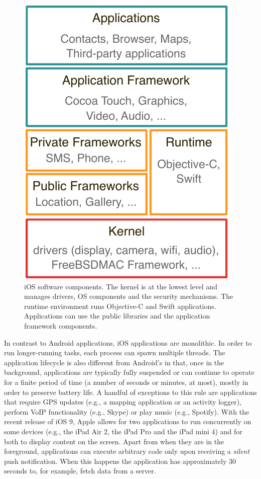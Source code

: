 \begin{figure}[!t]
    \centering
    \includegraphics[width=.5\columnwidth]{figures/others/bg_ios}
    \caption[iOS software components]{iOS software components. The kernel is at the lowest level and manages drivers, OS components and the security mechanisms. The runtime environment runs Objective-C and Swift applications. Applications can use the public libraries and the application framework components.}
    \label{fig:bg_ios_stack}
\end{figure}

In contrast to Android applications, iOS applications are monolithic. In order to run longer-running tasks, each process can spawn multiple threads. The application lifecycle is also different from Android's in that, once in the background, applications are typically fully suspended or can continue to operate for a finite period of time (a number of seconds or minutes, at most), mostly in order to preserve battery life. A handful of exceptions to this rule are applications that require GPS updates (e.g., a mapping application or an activity logger), perform VoIP functionality (e.g., Skype) or play music (e.g., Spotify). With the recent release of iOS 9, Apple allows for two applications to run concurrently on some devices (e.g., the iPad Air 2, the iPad Pro and the iPad mini 4) and for both to display content on the screen. Apart from when they are in the foreground, applications can execute arbitrary code only upon receiving a \emph{silent} push notification. When this happens the application has approximately 30 seconds to, for example, fetch data from a server. 

